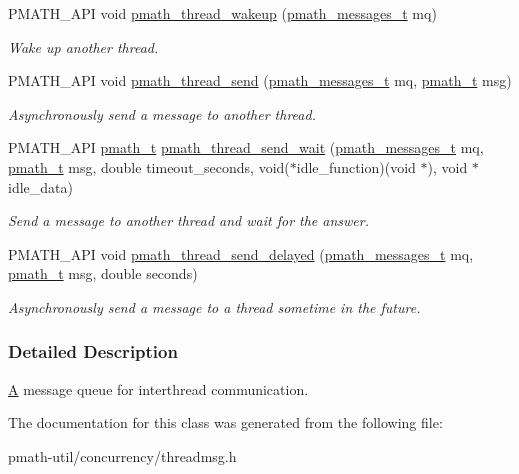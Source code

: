 \begin{CompactItemize}
PMATH\_\-API void \hyperlink{group__threadmsg_gbf90d49f5c42ccaa736ae5e56af6a4a6}{pmath\_\-thread\_\-wakeup} (\hyperlink{classpmath__messages__t}{pmath\_\-messages\_\-t} mq)
\begin{CompactList}\small\item\em Wake up another thread. \item\end{CompactList}\item 
PMATH\_\-API void \hyperlink{group__threadmsg_ga3867a708fb07b86e017e8f201ef7edd}{pmath\_\-thread\_\-send} (\hyperlink{classpmath__messages__t}{pmath\_\-messages\_\-t} mq, \hyperlink{classpmath__t}{pmath\_\-t} msg)
\begin{CompactList}\small\item\em Asynchronously send a message to another thread. \item\end{CompactList}\item 
PMATH\_\-API \hyperlink{classpmath__t}{pmath\_\-t} \hyperlink{group__threadmsg_g4ce8afcfec001a88441bdf8b50bcd157}{pmath\_\-thread\_\-send\_\-wait} (\hyperlink{classpmath__messages__t}{pmath\_\-messages\_\-t} mq, \hyperlink{classpmath__t}{pmath\_\-t} msg, double timeout\_\-seconds, void($\ast$idle\_\-function)(void $\ast$), void $\ast$idle\_\-data)
\begin{CompactList}\small\item\em Send a message to another thread and wait for the answer. \item\end{CompactList}\item 
PMATH\_\-API void \hyperlink{group__threadmsg_g75339d9dd1902293cb72b38e77caa742}{pmath\_\-thread\_\-send\_\-delayed} (\hyperlink{classpmath__messages__t}{pmath\_\-messages\_\-t} mq, \hyperlink{classpmath__t}{pmath\_\-t} msg, double seconds)
\begin{CompactList}\small\item\em Asynchronously send a message to a thread sometime in the future. \item\end{CompactList}\end{CompactItemize}


\subsubsection{Detailed Description}
\hyperlink{class_a}{A} message queue for interthread communication. 

The documentation for this class was generated from the following file:\begin{CompactItemize}
\item 
pmath-util/concurrency/threadmsg.h\end{CompactItemize}
